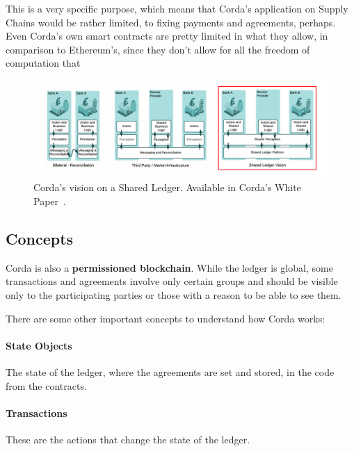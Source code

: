 This is a very specific purpose, which means that Corda's application on Supply Chains would be rather limited, to fixing payments and agreements, perhaps. Even Corda's own smart contracts are pretty limited in what they allow, in comparison to Ethereum's, since they don't allow for all the freedom of computation that


\begin{figure}[h]
\centering
\includegraphics[scale=0.16]{media/corda_shared_ledger.png}
\caption[Corda's vision on a Shared Ledger]{Corda's vision on a Shared Ledger. Available in Corda's White Paper~\cite{Brown2016}.}
\label{fig:shared_ledger}
\end{figure}

\subsection{Concepts}
Corda is also a \textbf{permissioned blockchain}. While the ledger is global, some transactions and agreements involve only certain groups and should be visible only to the participating parties or those with a reason to be able to see them. 

There are some other important concepts to understand how Corda works:
\paragraph{State Objects} The state of the ledger, where the agreements are set and stored, in the code from the contracts.
\paragraph{Transactions} These are the actions that change the state of the ledger.
